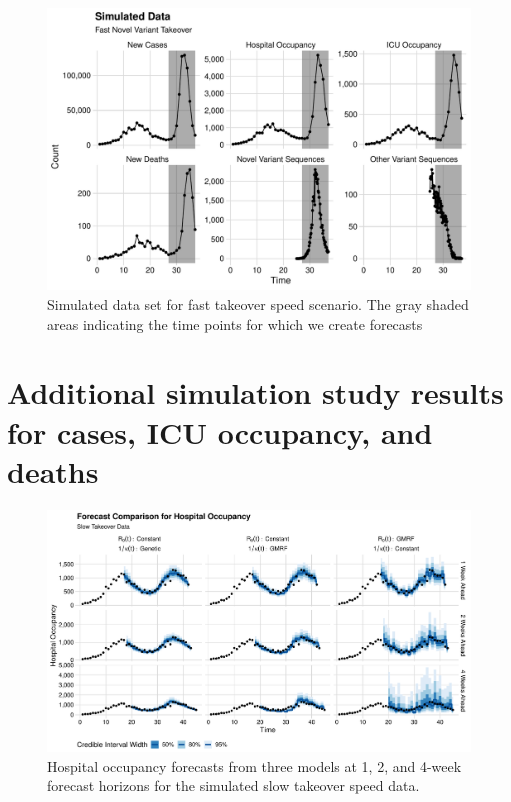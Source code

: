 \begin{figure}
    \centering
    \includegraphics[width=1.0\columnwidth]{simulated_binned_data_fast_plot}
    \caption[Simulated data set for fast takeover speed scenario.]{Simulated data set for fast takeover speed scenario.
    The gray shaded areas indicating the time points for which we create forecasts}
    \label{ch_5:fig:simulated_binned_data_fast_plot}
\end{figure}

\section{Additional simulation study results for cases, ICU occupancy, and deaths}
\label{ch_5:sec:sim_cases_icu_death}

\begin{figure}
    \centering
    \includegraphics[width=1.0\columnwidth]{simulated_forecast_comparison_data_hospitalizations_slow_plot}
\caption[Hospital occupancy forecasts for simulated slow takeover speed data.]{Hospital occupancy forecasts from three models at 1, 2, and 4-week forecast horizons for the simulated slow takeover speed data.}
    \label{ch_5:fig:simulated_forecast_comparison_data_hospitalizations_slow_plot}
\end{figure}

